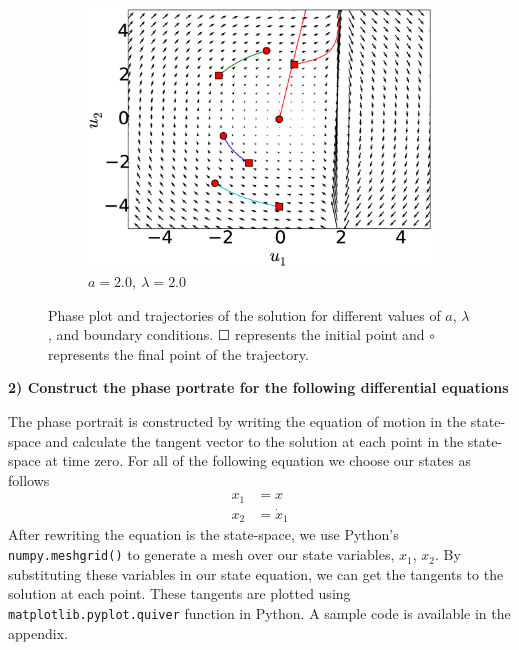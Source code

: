 \documentclass[12pt, a4paper]{extreport}
\begin{document}
\begin{figure}[H]
\begin{subfigure}[h]{8.0 cm}
        \includegraphics[width=8.0 cm]{figure/phase_a20_lambda20.eps}
		\caption{$a=2.0,\ \lambda = 2.0$}
    \end{subfigure}
    \caption{Phase plot and trajectories of the solution for different values of $a$, $\lambda$, and boundary conditions. $\Square$ represents the initial point and $\circ$ represents the final point of the trajectory.}
    \label{fig:phasePlot}
\end{figure}
%
\newpage
{\flushleft\large{\textbf{2) Construct the phase portrate for the following differential equations}}}

The phase portrait is constructed by writing the equation of motion in the state-space and calculate the tangent vector to the solution at each point in the state-space at time zero. For all of the following equation we choose our states as follows
%
\begin{equation*}
\begin{aligned}
	x_1 &= x \\
	x_2 &= \dot{x}_1
\end{aligned}
\end{equation*}
%
After rewriting the equation is the state-space, we use Python's \texttt{numpy.meshgrid()} to generate a mesh over our state variables, $x_1$, $x_2$. By substituting these variables in our state equation, we can get the tangents to the solution at each point. These tangents are plotted using \texttt{matplotlib.pyplot.quiver} function in Python. A sample code is available in the appendix.
\end{document}

